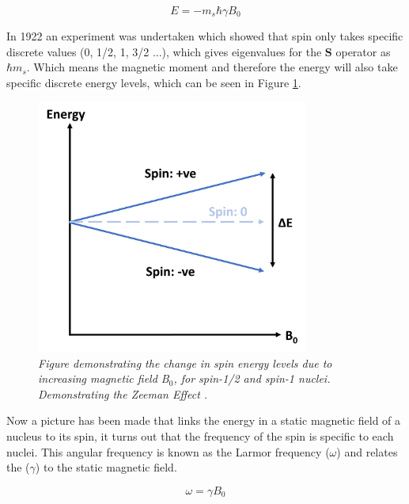 \begin{equation}
    E = -m_s\hbar \gamma B_0
    \label{eqn:theory:ESpin}
\end{equation}

In 1922 an experiment was undertaken \cite{Gerlach1922DerMagnetfeld} which showed that spin only takes specific discrete values (0, 1/2, 1, 3/2 ...), which gives eigenvalues for the $\mathbf{S}$ operator as $\hbar m_s$. Which means the magnetic moment and therefore the energy will also take specific discrete energy levels, which can be seen in Figure \ref{fig:theory:zeeman}.

\begin{figure}[h]
    \centering
    \includegraphics[width=0.8\textwidth]{Figures/Theory/Zeeman.png}
    \caption{\textit{Figure demonstrating the change in spin energy levels due to increasing magnetic field B$_0$, for spin-1/2 and spin-1 nuclei. Demonstrating the Zeeman Effect \cite{Zeeman1896VerslagenAfdeeling}.}}
    \label{fig:theory:zeeman}
\end{figure}

Now a picture has been made that links the energy in a static magnetic field of a nucleus to its spin, it turns out that the frequency of the spin is specific to each nuclei. This angular frequency is known as the Larmor frequency \cite{Larmor1897LXIII.Ions} ($\omega$) and relates the ($\gamma$) to the static magnetic field.

\begin{equation}
    \omega = \gamma B_0
    \label{eqn:theory:Lamor}
\end{equation}

